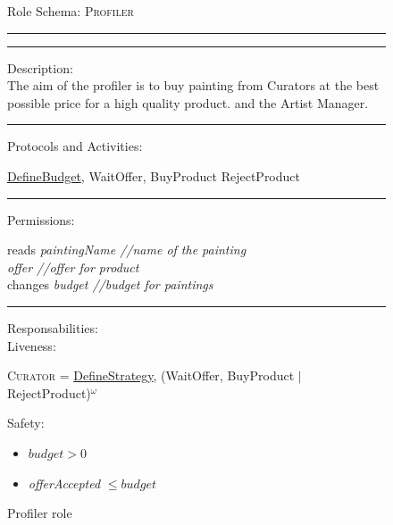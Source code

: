 \documentclass[a4paper,11pt]{report}
\begin{document}
  \begin{figure}[ht!]
    \begin{mdframed}
      Role Schema: \textsc{Profiler} \\ \hrule \vspace{2pt} \hrule \vspace{10pt}
      Description:\\
      The aim of the profiler is to buy painting from Curators at the best possible
      price for a high quality product.
      and the Artist Manager.
      \\ \hrule \vspace{10pt}
      Protocols and Activities:
      \vspace{-10pt}
      \begin{flushleft}
       \underline{DefineBudget}, WaitOffer, BuyProduct
       RejectProduct
      \end{flushleft}
      \hrule \vspace{10pt}
      Permissions:\\
      \vspace{-10pt}
      \begin{center}
       reads \textit{paintingName //name of the painting}\\
	    \textit{offer //offer for product}\\
      changes \textit{budget //budget for paintings}
      \end{center}
      \hrule \vspace{10pt}
      Responsabilities:\\
      Liveness:
      \vspace{-10pt}
      \begin{flushleft}
      \small\textsc{Curator} = \underline{DefineStrategy}, (WaitOffer, BuyProduct $\mid$
      RejectProduct)$^\omega$
      \end{flushleft}
      Safety:
      \vspace{-10pt}
      \begin{itemize}
      \itemsep0em
      \item $budget > 0$
       \item \textit{offerAccepted} $\leq budget$
      \end{itemize}
    \end{mdframed}
  \caption{Profiler role}
  \label{figure:role_profiler}
  \end{figure}
  
\end{document}
